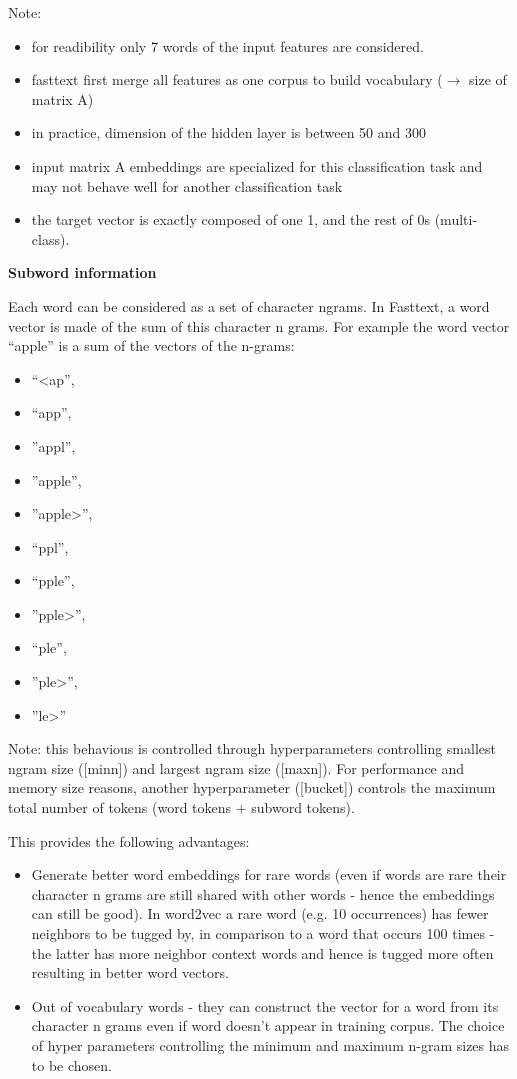 Note: 
\begin{itemize}
	\item for readibility only 7 words of the input features are considered.
	\item fasttext first merge all features as one corpus to build vocabulary ($\rightarrow$ size of matrix A)
	\item in practice, dimension of the hidden layer is between 50 and 300
	\item input matrix A embeddings are specialized for this classification task and may not behave well for another classification task
	\item the target vector is exactly composed of one 1, and the rest of 0s (multi-class).
\end{itemize}

\textbf{Subword information}

Each word can be considered as a set of character ngrams. In Fasttext, a word vector is made of the sum of this character n grams. For example the word vector “apple” is a sum of the vectors of the n-grams:
\begin{multicols}{4}
\begin{itemize}
	\item “<ap”, 
	\item “app”, 
	\item ”appl”, 
	\item ”apple”, 
	\item ”apple>”, 
	\item “ppl”, 
	\item “pple”, 
	\item ”pple>”, 
	\item “ple”, 
	\item ”ple>”, 
	\item ”le>”
\end{itemize}
\end{multicols}
Note: this behavious is controlled through hyperparameters controlling smallest ngram size ([minn]) and largest ngram size ([maxn]). For performance and memory size reasons, another hyperparameter ([bucket]) controls the maximum total number of tokens (word tokens + subword tokens).

This provides the following advantages:
\begin{itemize}
	\item Generate better word embeddings for rare words (even if words are rare their character n grams are still shared with other words - hence the embeddings can still be good). In word2vec a rare word (e.g. 10 occurrences) has fewer neighbors to be tugged by, in comparison to a word that occurs 100 times - the latter has more neighbor context words and hence is tugged more often resulting in better word vectors.
	\item Out of vocabulary words - they can construct the vector for a word from its character n grams even if word doesn't appear in training corpus. The choice of hyper parameters controlling the minimum and maximum n-gram sizes has to be chosen.
\end{itemize}

